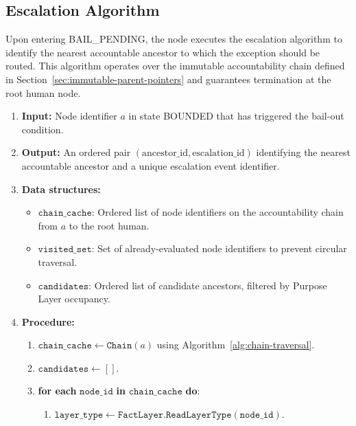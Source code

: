 \subsection{Escalation Algorithm}
\label{sec:escalation}

Upon entering BAIL\_PENDING, the node executes the escalation algorithm to identify the nearest accountable ancestor to which the exception should be routed. This algorithm operates over the immutable accountability chain defined in Section~\ref{sec:immutable-parent-pointers} and guarantees termination at the root human node.

\begin{algorithm}[htbp]
\caption{Escalation Path Computation}
\label{alg:escalation}
\begin{enumerate}[noitemsep]
    \item \textbf{Input:} Node identifier $a$ in state BOUNDED that has triggered the bail-out condition.
    \item \textbf{Output:} An ordered pair $(\text{ancestor\_id}, \text{escalation\_id})$ identifying the nearest accountable ancestor and a unique escalation event identifier.
    \item \textbf{Data structures:}
    \begin{itemize}[noitemsep]
        \item $\texttt{chain\_cache}$: Ordered list of node identifiers on the accountability chain from $a$ to the root human.
        \item $\texttt{visited\_set}$: Set of already-evaluated node identifiers to prevent circular traversal.
        \item $\texttt{candidates}$: Ordered list of candidate ancestors, filtered by Purpose Layer occupancy.
    \end{itemize}
    \item \textbf{Procedure:}
    \begin{enumerate}[noitemsep]
        \item $\texttt{chain\_cache} \leftarrow \texttt{Chain}(a)$ using Algorithm~\ref{alg:chain-traversal}.
        \item $\texttt{candidates} \leftarrow []$.
        \item \textbf{for each} $\texttt{node\_id}$ \textbf{in} $\texttt{chain\_cache}$ \textbf{do}:
        \begin{enumerate}[noitemsep]
            \item $\texttt{layer\_type} \leftarrow \texttt{FactLayer.ReadLayerType}(\texttt{node\_id})$.

\end{enumerate}
\end{enumerate}
\end{enumerate}
\end{algorithm}
